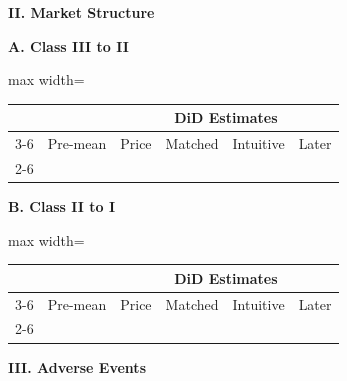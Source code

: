 \documentclass[letterpaper,12pt]{article}
\theoremstyle{definition}
\begin{document}
\begin{table}[t]
\begin{threeparttable}
\vspace{10pt}

\textbf{II. Market Structure}\par\vspace{4pt}

\begin{minipage}[t]{0.49\textwidth}
\centering\footnotesize
\textbf{A. Class III to II}\par\vspace{2pt}
\begin{adjustbox}{max width=\linewidth}
\begin{tabular}{@{}lccccc@{}}
\toprule
 &  & \multicolumn{4}{c}{DiD Estimates}\\
\cmidrule(lr){3-6}
 & Pre-mean & Price & Matched & Intuitive & Later \\
\cmidrule(lr){2-6}

\bottomrule
\end{tabular}
\end{adjustbox}
\end{minipage}\hfill
\begin{minipage}[t]{0.49\textwidth}
\centering\footnotesize
\textbf{B. Class II to I}\par\vspace{2pt}
\begin{adjustbox}{max width=\linewidth}
\begin{tabular}{@{}lccccc@{}}
\toprule
 &  & \multicolumn{4}{c}{DiD Estimates}\\
\cmidrule(lr){3-6}
 & Pre-mean & Price & Matched & Intuitive & Later \\
\cmidrule(lr){2-6}

\bottomrule
\end{tabular}
\end{adjustbox}
\end{minipage}

\vspace{10pt}

\textbf{III. Adverse Events}\par\vspace{4pt}


\end{threeparttable}
\end{table}
\end{document}
